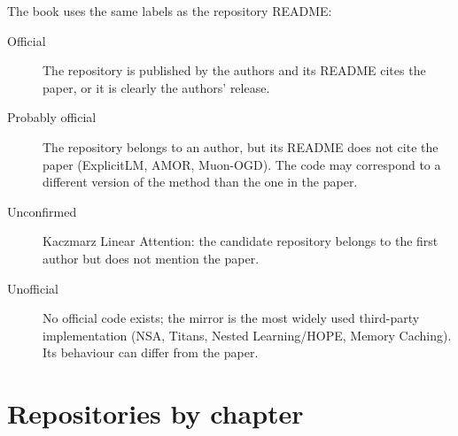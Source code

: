 The book uses the same labels as the repository README:
\begin{description}
  \item[Official] The repository is published by the authors and its README cites the paper,
    or it is clearly the authors' release.
  \item[Probably official] The repository belongs to an author, but its README does not cite
    the paper (ExplicitLM, AMOR, Muon-OGD). The code may correspond to a different version of
    the method than the one in the paper.
  \item[Unconfirmed] Kaczmarz Linear Attention: the candidate repository belongs to the first
    author but does not mention the paper.
  \item[Unofficial] No official code exists; the mirror is the most widely used third-party
    implementation (NSA, Titans, Nested Learning/HOPE, Memory Caching). Its behaviour can
    differ from the paper.
\end{description}

\section{Repositories by chapter}

